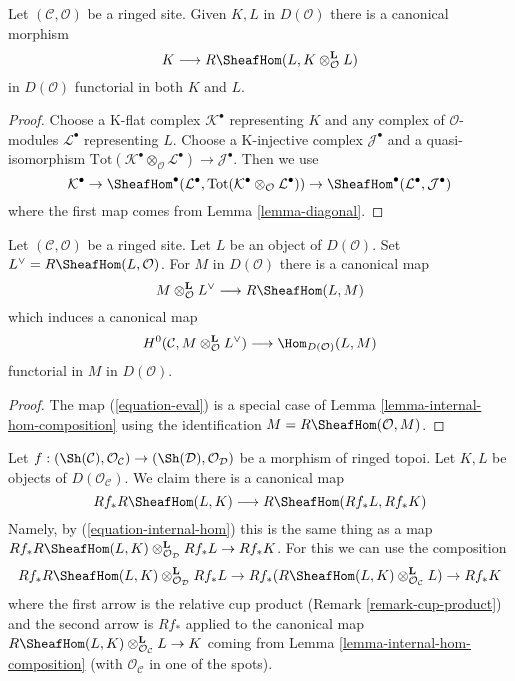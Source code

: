 \begin{lemma}
\label{lemma-internal-hom-diagonal}
Let $(\mathcal{C}, \mathcal{O})$ be a ringed site.
Given $K, L$ in $D(\mathcal{O})$ there is a canonical morphism
$$
K \longrightarrow R\SheafHom(L, K \otimes_\mathcal{O}^\mathbf{L} L)
$$
in $D(\mathcal{O})$ functorial in both $K$ and $L$.
\end{lemma}

\begin{proof}
Choose a K-flat complex $\mathcal{K}^\bullet$ representing $K$
and any complex of $\mathcal{O}$-modules $\mathcal{L}^\bullet$
representing $L$. Choose a K-injective complex $\mathcal{J}^\bullet$
and a quasi-isomorphism
$\text{Tot}(\mathcal{K}^\bullet \otimes_\mathcal{O} \mathcal{L}^\bullet)
\to \mathcal{J}^\bullet$. Then we use
$$
\mathcal{K}^\bullet \to
\SheafHom^\bullet(\mathcal{L}^\bullet,
\text{Tot}(\mathcal{K}^\bullet \otimes_\mathcal{O} \mathcal{L}^\bullet))
\to
\SheafHom^\bullet(\mathcal{L}^\bullet, \mathcal{J}^\bullet)
$$
where the first map comes from Lemma \ref{lemma-diagonal}.
\end{proof}

\begin{lemma}
\label{lemma-dual}
Let $(\mathcal{C}, \mathcal{O})$ be a ringed site. Let $L$ be an
object of $D(\mathcal{O})$. Set $L^\vee = R\SheafHom(L, \mathcal{O})$.
For $M$ in $D(\mathcal{O})$ there is a canonical map
\begin{equation}
\label{equation-eval}
M \otimes^\mathbf{L}_\mathcal{O} L^\vee \longrightarrow R\SheafHom(L, M)
\end{equation}
which induces a canonical map
$$
H^0(\mathcal{C}, M \otimes_\mathcal{O}^\mathbf{L} L^\vee)
\longrightarrow
\Hom_{D(\mathcal{O})}(L, M)
$$
functorial in $M$ in $D(\mathcal{O})$.
\end{lemma}

\begin{proof}
The map (\ref{equation-eval}) is a special case of
Lemma \ref{lemma-internal-hom-composition}
using the identification $M = R\SheafHom(\mathcal{O}, M)$.
\end{proof}

\begin{remark}
\label{remark-projection-formula-for-internal-hom}
Let $f : (\Sh(\mathcal{C}), \mathcal{O}_\mathcal{C}) \to
(\Sh(\mathcal{D}), \mathcal{O}_\mathcal{D})$ be a morphism of ringed topoi.
Let $K, L$ be objects of $D(\mathcal{O}_\mathcal{C})$. We claim there is
a canonical map
$$
Rf_*R\SheafHom(L, K) \longrightarrow R\SheafHom(Rf_*L, Rf_*K)
$$
Namely, by (\ref{equation-internal-hom}) this is the same thing
as a map
$Rf_*R\SheafHom(L, K) \otimes_{\mathcal{O}_\mathcal{D}}^\mathbf{L} Rf_*L
\to Rf_*K$.
For this we can use the composition
$$
Rf_*R\SheafHom(L, K) \otimes_{\mathcal{O}_\mathcal{D}}^\mathbf{L} Rf_*L \to
Rf_*(R\SheafHom(L, K) \otimes_{\mathcal{O}_\mathcal{C}}^\mathbf{L} L) \to
Rf_*K
$$
where the first arrow is the relative cup product
(Remark \ref{remark-cup-product}) and the second arrow is $Rf_*$ applied
to the canonical map
$R\SheafHom(L, K) \otimes_{\mathcal{O}_\mathcal{C}}^\mathbf{L} L \to K$
coming from Lemma \ref{lemma-internal-hom-composition}
(with $\mathcal{O}_\mathcal{C}$ in one of the spots).
\end{remark}

